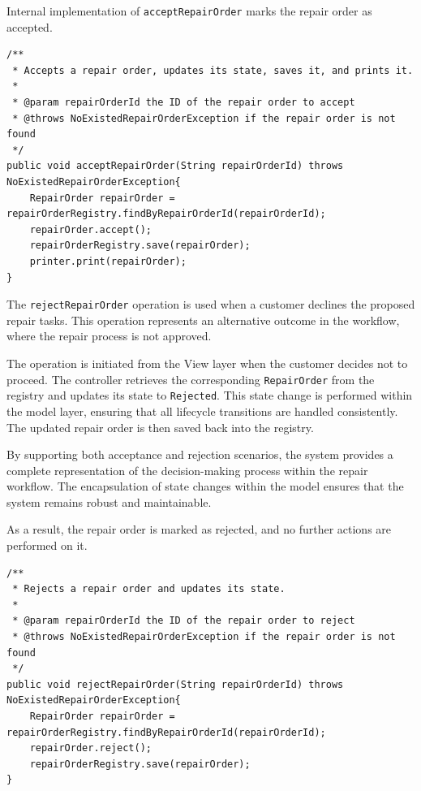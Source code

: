 \documentclass[a4paper]{scrartcl}
\begin{document}
Internal implementation of \texttt{acceptRepairOrder} marks the repair order as accepted.

\begin{lstlisting}[style=javastyle, caption={Implementation of \texttt{acceptRepairOrder} in \texttt{ReceptionistController}}]
/**
 * Accepts a repair order, updates its state, saves it, and prints it.
 *
 * @param repairOrderId the ID of the repair order to accept
 * @throws NoExistedRepairOrderException if the repair order is not found
 */
public void acceptRepairOrder(String repairOrderId) throws NoExistedRepairOrderException{
    RepairOrder repairOrder = repairOrderRegistry.findByRepairOrderId(repairOrderId);
    repairOrder.accept();
    repairOrderRegistry.save(repairOrder);
    printer.print(repairOrder);
}
\end{lstlisting}

The \texttt{rejectRepairOrder} operation is used when a customer declines the proposed repair tasks. This operation represents an alternative outcome in the workflow, where the repair process is not approved.

The operation is initiated from the View layer when the customer decides not to proceed. The controller retrieves the corresponding \texttt{RepairOrder} from the registry and updates its state to \texttt{Rejected}. This state change is performed within the model layer, ensuring that all lifecycle transitions are handled consistently. The updated repair order is then saved back into the registry.

By supporting both acceptance and rejection scenarios, the system provides a complete representation of the decision-making process within the repair workflow. The encapsulation of state changes within the model ensures that the system remains robust and maintainable.

As a result, the repair order is marked as rejected, and no further actions are performed on it.

\begin{lstlisting}[style=javastyle, caption={Implementation of \texttt{rejectRepairOrder} in \texttt{ReceptionistController}}]
/**
 * Rejects a repair order and updates its state.
 *
 * @param repairOrderId the ID of the repair order to reject
 * @throws NoExistedRepairOrderException if the repair order is not found
 */
public void rejectRepairOrder(String repairOrderId) throws NoExistedRepairOrderException{
    RepairOrder repairOrder = repairOrderRegistry.findByRepairOrderId(repairOrderId);
    repairOrder.reject();
    repairOrderRegistry.save(repairOrder);
}
\end{lstlisting}
\end{document}
